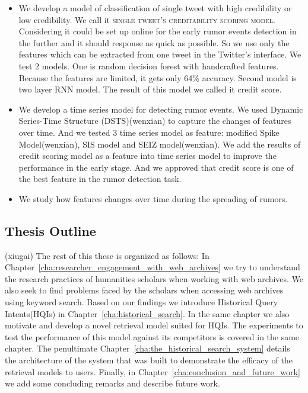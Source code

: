 \begin{itemize}
	
	\item We develop a model of classification of single tweet with high credibility or low credibility. We call it \textsc{single tweet's creditability scoring model}. Considering it could be set up online for the early rumor events detection in the further and it should response as quick as possible. So we use only the features which can be extracted from one tweet in the Twitter's interface. We test 2 models. One is random decision forest with handcrafted features. Because the features are limited, it gets only 64\% accuracy. Second model is two layer RNN model. The result of this model we called it credit score.

 	\item We develop a time series model for detecting rumor events. We used Dynamic Series-Time Structure (DSTS)(wenxian) to capture the changes of features over time. And we tested 3 time series model as feature: modified Spike Model(wenxian), SIS model and SEIZ model(wenxian). We add the results of credit scoring model as a feature into time series model to improve the performance in the early stage. And we approved that credit score is one of the best feature in the rumor detection task.

 	\item We study how features changes over time during the spreading of rumors.

 \end{itemize}
 
 
\subsection{Thesis Outline}

(xiugai)
The rest of this these is organized as follows: In Chapter~\ref{cha:researcher_engagement_with_web_archives} we try to understand the research practices of humanities scholars when working with web archives. We also seek to find problems faced by the scholars when accessing web archives using keyword search. Based on our findings we introduce Historical Query Intents(HQIs) in Chapter~\ref{cha:historical_search}. In the same chapter we also motivate and develop a novel retrieval model suited for HQIs. The experiments to test the performance of this model against its competitors is covered in the same chapter. The penultimate Chapter~\ref{cha:the_historical_search_system} details the architecture of the system that was built to demonstrate the efficacy of the retrieval models to users. Finally, in Chapter~\ref{cha:conclusion_and_future_work} we add some concluding remarks and describe future work.

